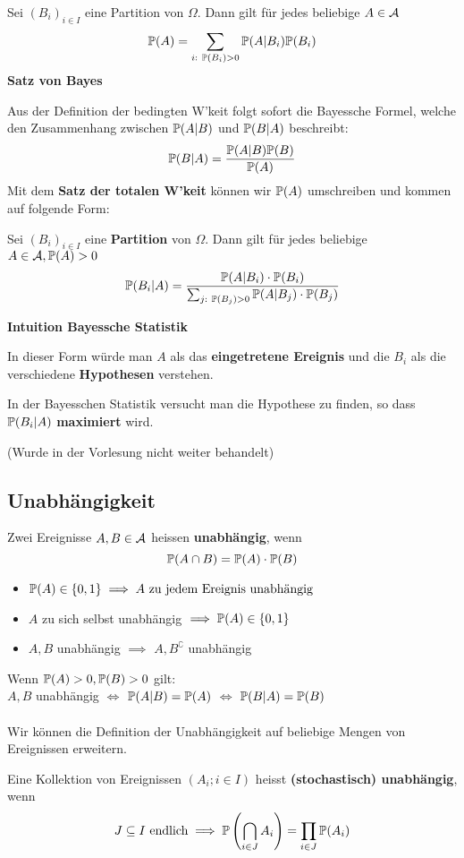 Sei $(B_i)_{i\in I}$ eine Partition von $\Omega$. Dann gilt für jedes beliebige $A \in \A$
$$\P(A) = \sum_{i:\ \P(B_i)>0} \P(A|B_i)\P(B_i)$$
\textbf{Satz von Bayes}

Aus der Definition der bedingten W'keit folgt sofort die Bayessche Formel, welche den Zusammenhang zwischen $\P(A|B)$ und $\P(B|A)$ beschreibt:
$$\P(B|A) = \frac{\P(A|B)\P(B)}{\P(A)}$$
Mit dem \textbf{Satz der totalen W'keit} können wir $\P(A)$ umschreiben und kommen auf folgende Form:

Sei $(B_i)_{i\in I}$ eine \textbf{Partition} von $\Omega$. Dann gilt für jedes beliebige $A \in \A, \P(A) > 0$
$$\P(B_i|A) = \frac{\P(A|B_i)\cdot\P(B_i)}{\sum_{j:\ \P(B_j)>0}\P(A|B_j)\cdot \P(B_j)}$$

\textbf{Intuition Bayessche Statistik}

In dieser Form würde man $A$ als das \textbf{eingetretene Ereignis} und die $B_i$ als die verschiedene \textbf{Hypothesen} verstehen. 

In der Bayesschen Statistik versucht man die Hypothese zu finden, so dass $\P(B_i|A)$ \textbf{maximiert} wird.

(Wurde in der Vorlesung nicht weiter behandelt)
\subsection{Unabhängigkeit} 
\begin{mainbox}{}
    Zwei Ereignisse $A, B \in \A$ heissen \textbf{unabhängig}, wenn 
    $$\P(A\cap B) = \P(A) \cdot \P(B)$$
\end{mainbox}
\begin{itemize}
    \item $\P(A) \in \{0, 1\} \implies A \text{ zu jedem Ereignis unabhängig}$
    \item $A$ zu sich selbst unabhängig $\implies \P(A) \in \{0,1\}$
    \item $A, B$ unabhängig $\implies$ $A, B^\complement$ unabhängig
\end{itemize}
Wenn $\P(A) > 0, \P(B) > 0$ gilt:\\
 $A,B$ unabhängig $\iff$ $\P(A|B)=\P(A)$ $\iff$ $\P(B|A)=\P(B)$
\\
\\
Wir können die Definition der Unabhängigkeit auf beliebige Mengen von Ereignissen erweitern.
\begin{mainbox}{}
    Eine Kollektion von Ereignissen $(A_i; i \in I)$ heisst \textbf{(stochastisch) unabhängig}, wenn 
    $$J \subseteq I \text{ endlich} \implies \P\left(\bigcap_{i\in J} A_i\right) = \prod_{i \in J} \P(A_i)$$
\end{mainbox}

